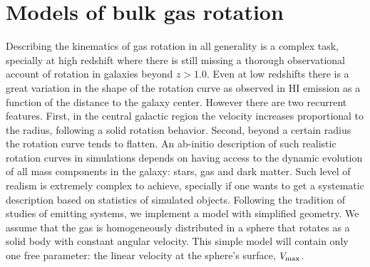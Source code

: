 \section{Models of bulk gas rotation}
\label{sec:implementation}
Describing the kinematics of gas rotation in all generality is a
complex task, specially at high redshift where there is still missing
a thorough observational account of rotation in galaxies beyond
$z>1.0$. Even at low redshifts there is a great
variation in the shape of the rotation curve as observed in HI
emission as a function of the distance to the galaxy center. However
there are two recurrent features. First, in the
central galactic region the velocity increases proportional to the radius,
following a solid rotation behavior. Second, beyond a certain radius
the rotation curve tends to flatten. An ab-initio description of
such realistic rotation curves in simulations depends on having access to
the dynamic evolution of all mass components in the galaxy: stars, gas
and dark matter. Such level of realism is extremely complex to
achieve, specially if one wants to get a systematic description based
on statistics of simulated objects.
Following the tradition of studies of \ly emitting systems,
we implement a model with simplified geometry. We assume that the gas
is homogeneously distributed in a sphere that rotates as a solid body
with constant angular velocity. This simple model will contain only
one free parameter: the linear velocity at the sphere's surface, $V_{\rm
max}$.
